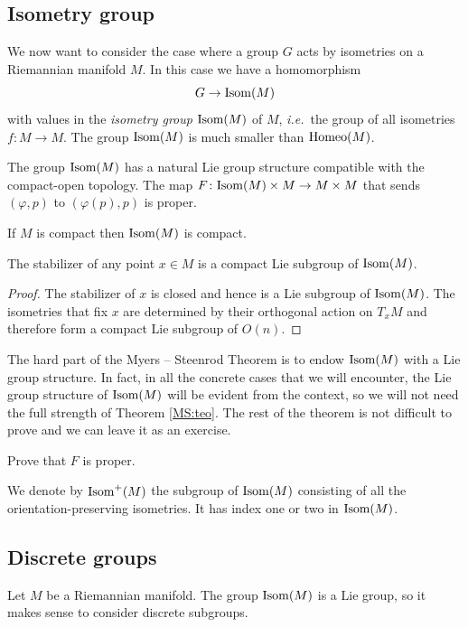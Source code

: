 \subsection{Isometry group}
We now want to consider the case where a group $G$ acts by isometries on a Riemannian manifold $M$. In this case we have a homomorphism
$$G \to {\rm Isom}(M)$$
with values in the \emph{isometry group} ${\rm Isom}(M)$ of $M$, \emph{i.e.}~the group of all isometries $f \colon M \to M$. The group ${\rm Isom}(M)$ is much smaller than ${\rm Homeo} (M)$.  

\begin{teo} \label{MS:teo}
The group ${\rm Isom} (M)$ has a natural Lie group structure compatible with the compact-open topology. The map $F\colon {\rm Isom}(M) \times M \to M \times M$ that sends
$(\varphi, p)$ to $(\varphi(p), p)$ is proper.
\end{teo}
\begin{cor} If $M$ is compact then ${\rm Isom}(M)$ is compact.
\end{cor}

\begin{prop} \label{stabilizer:compact:prop}
The stabilizer of any point $x\in M$ is a compact Lie subgroup of ${\rm Isom}(M)$.
\end{prop}
\begin{proof}
The stabilizer of $x$ is closed and hence is a Lie subgroup of ${\rm Isom}(M)$. The isometries that fix $x$ are determined by their orthogonal action on $T_xM$ and therefore form a compact Lie subgroup of $O(n)$. 
\end{proof}

The hard part of the Myers -- Steenrod Theorem is to endow ${\rm Isom}(M)$ with a Lie group structure. In fact, in all the concrete cases that we will encounter, the Lie group structure of ${\rm Isom}(M)$ will be evident from the context, so we will not need the full strength of Theorem \ref{MS:teo}. The rest of the theorem is not difficult to prove and we can leave it as an exercise.

\begin{ex} Prove that $F$ is proper.
\end{ex}

We denote by ${\rm Isom}^+(M)$ the subgroup of ${\rm Isom}(M)$ consisting of all the orientation-preserving isometries. It has index one or two in ${\rm Isom}(M)$.

\subsection{Discrete groups}
Let $M$ be a Riemannian manifold. The group ${\rm Isom}(M)$ is a Lie group, so it makes sense to consider discrete subgroups.

